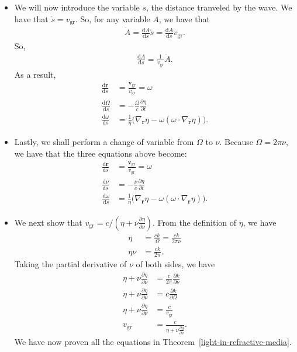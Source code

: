 \documentclass[10pt]{article}
\newcommand{\dee}{\mathrm{d}}
\newcommand{\ve}[1]{\mathbf{#1}}
\newcommand{\group}{\mathrm{gr}}
\begin{document}
\begin{itemize}
    \item We will now introduce the variable $s$, the distance tranveled by the wave. We have that $\dot s = v_\group$. So, for any variable $A$, we have that
    \begin{align*}
      \dot A = \frac{\dee A}{\dee s} \dot s = \frac{\dee A}{\dee s} v_\group.
    \end{align*}
    So,
    \begin{align*}
      \frac{\dee A}{\dee s} = \frac{1}{v_\group} \dot A.
    \end{align*}
    As a result,
    \begin{align*}
      \frac{\dee \ve{r}}{\dee s} &= \frac{\ve{v}_\group}{v_\group} = \omega\\
      \frac{\dee \Omega}{\dee s} &= -\frac{\Omega}{c} \frac{\partial \eta}{\partial t}\\
      \frac{\dee \omega}{\dee s} &= \frac{1}{\eta} \big( \nabla_{\ve{r}}\eta - \omega(\omega \cdot \nabla_{\ve{r}}\eta)\big).      
    \end{align*}

    \item Lastly, we shall perform a change of variable from $\Omega$ to $\nu$. Because $\Omega = 2\pi \nu$, we have that the three equations above become:
    \begin{align*}
      \frac{\dee \ve{r}}{\dee s} &= \frac{\ve{v}_\group}{v_\group} = \omega\\
      \frac{\dee \nu}{\dee s} &= -\frac{\nu}{c} \frac{\partial \eta}{\partial t}\\
      \frac{\dee \omega}{\dee s} &= \frac{1}{\eta} \big( \nabla_{\ve{r}}\eta - \omega(\omega \cdot \nabla_{\ve{r}}\eta)\big).
    \end{align*}

    \item We next show that $v_\group = c/(\eta + \nu \frac{\partial \eta}{\partial \nu})$. From the definition of $\eta$, we have
    \begin{align*}
      \eta &= \frac{ck}{\Omega} = \frac{ck}{2\pi \nu}\\
      \eta \nu &= \frac{ck}{2\pi}.
    \end{align*}
    Taking the partial derivative of $\nu$ of both sides, we have
    \begin{align*}
      \eta + \nu \frac{\partial \eta}{\partial \nu}
      &= \frac{c}{2\pi}\frac{\partial k}{\partial \nu} \\
      \eta + \nu \frac{\partial \eta}{\partial \nu}
      &= c\frac{\partial k}{\partial \Omega} \\
      \eta + \nu \frac{\partial \eta}{\partial \nu}
      &= \frac{c}{v_\group} \\
      v_\group &= \frac{c}{\eta + \nu \frac{\partial \eta}{\partial \nu}}.
    \end{align*}
    We have now proven all the equations in Theorem~\ref{light-in-refractive-media}.


\end{itemize}
\end{document}
